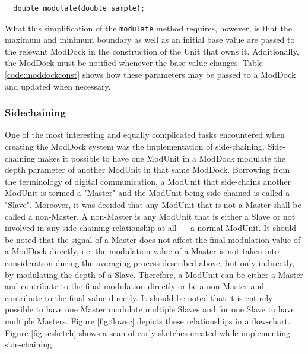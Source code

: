 \documentclass[12pt,twoside]{report}
\begin{document}
\begin{lstlisting}
  double modulate(double sample);
\end{lstlisting}

\noindent What this simplification of the \texttt{modulate} method requires, however, is that the maximum and minimum boundary as well as an initial base value are passed to the relevant ModDock in the construction of the Unit that owns it. Additionally, the ModDock must be notified whenever the base value changes. Table \ref{code:moddockconst} shows how these parameters may be passed to a ModDock and updated when necessary.

\begin{table}[ht!]
  \caption{}
  \label{code:moddockconst}
\end{table}

\subsubsection{Sidechaining}

One of the most interesting and equally complicated tasks encountered when creating the ModDock system was the implementation of side-chaining. Side-chaining makes it possible to have one ModUnit in a ModDock modulate the depth parameter of another ModUnit in that same ModDock. Borrowing from the terminology of digital communication, a ModUnit that side-chains another ModUnit is termed a "Master" and the ModUnit being side-chained is called a "Slave". Moreover, it was decided that any ModUnit that is not a Master shall be called a non-Master. A non-Master is any ModUnit that is either a Slave or not involved in any side-chaining relationship at all --- a normal ModUnit. It should be noted that the signal of a Master does not affect the final modulation value of a ModDock directly, i.e. the modulation value of a Master is not taken into consideration during the averaging process described above, but only indirectly, by modulating the depth of a Slave. Therefore, a ModUnit can be either a Master and contribute to the final modulation directly or be a non-Master and contribute to the final value directly. It should be noted that it is entirely possible to have one Master modulate multiple Slaves and for one Slave to have multiple Masters. Figure \ref{fig:flowsc} depicts these relationships in a flow-chart. Figure \ref{fig:scsketch} shows a scan of early sketches created while implementing side-chaining.\\
\end{document}
